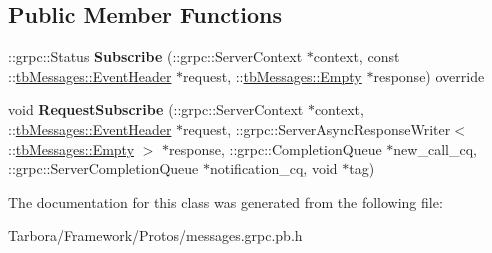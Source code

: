 \subsection*{Public Member Functions}
\begin{DoxyCompactItemize}
\item 
\mbox{\label{classtbMessages_1_1TarboraMessages_1_1WithAsyncMethod__Subscribe_a7010df5deaad8841331f916807077a9c}} 
\+::grpc\+::\+Status {\bfseries Subscribe} (\+::grpc\+::\+Server\+Context $\ast$context, const \+::\hyperlink{classtbMessages_1_1EventHeader}{tb\+Messages\+::\+Event\+Header} $\ast$request, \+::\hyperlink{classtbMessages_1_1Empty}{tb\+Messages\+::\+Empty} $\ast$response) override
\item 
\mbox{\label{classtbMessages_1_1TarboraMessages_1_1WithAsyncMethod__Subscribe_abad97007b7f985628f076388717b89af}} 
void {\bfseries Request\+Subscribe} (\+::grpc\+::\+Server\+Context $\ast$context, \+::\hyperlink{classtbMessages_1_1EventHeader}{tb\+Messages\+::\+Event\+Header} $\ast$request, \+::grpc\+::\+Server\+Async\+Response\+Writer$<$ \+::\hyperlink{classtbMessages_1_1Empty}{tb\+Messages\+::\+Empty} $>$ $\ast$response, \+::grpc\+::\+Completion\+Queue $\ast$new\+\_\+call\+\_\+cq, \+::grpc\+::\+Server\+Completion\+Queue $\ast$notification\+\_\+cq, void $\ast$tag)
\end{DoxyCompactItemize}


The documentation for this class was generated from the following file\+:\begin{DoxyCompactItemize}
\item 
Tarbora/\+Framework/\+Protos/messages.\+grpc.\+pb.\+h\end{DoxyCompactItemize}
